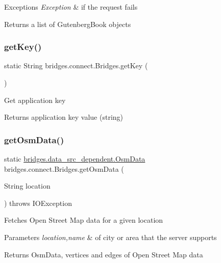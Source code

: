 \begin{DoxyExceptions}{Exceptions}
{\em Exception} & if the request fails\\
\hline
\end{DoxyExceptions}
\begin{DoxyReturn}{Returns}
a list of Gutenberg\+Book objects 
\end{DoxyReturn}
\mbox{\label{classbridges_1_1connect_1_1_bridges_a426897d6e5449601bb4e20c32b8346f5}} 
\subsubsection{\texorpdfstring{getKey()}{getKey()}}
{\footnotesize\ttfamily static String bridges.\+connect.\+Bridges.\+get\+Key (\begin{DoxyParamCaption}{ }\end{DoxyParamCaption})\hspace{0.3cm}{\ttfamily [static]}}

Get application key

\begin{DoxyReturn}{Returns}
application key value (string) 
\end{DoxyReturn}
\mbox{\label{classbridges_1_1connect_1_1_bridges_a25bb61cd96bd844c01a1658a02a295b3}} 
\subsubsection{\texorpdfstring{getOsmData()}{getOsmData()}}
{\footnotesize\ttfamily static \mbox{\hyperlink{classbridges_1_1data__src__dependent_1_1_osm_data}{bridges.\+data\+\_\+src\+\_\+dependent.\+Osm\+Data}} bridges.\+connect.\+Bridges.\+get\+Osm\+Data (\begin{DoxyParamCaption}\item[{String}]{location }\end{DoxyParamCaption}) throws I\+O\+Exception\hspace{0.3cm}{\ttfamily [static]}}

Fetches Open Street Map data for a given location 
\begin{DoxyParams}{Parameters}
{\em location,name} & of city or area that the server supports \\
\hline
\end{DoxyParams}
\begin{DoxyReturn}{Returns}
Osm\+Data, vertices and edges of Open Street Map data 
\end{DoxyReturn}

